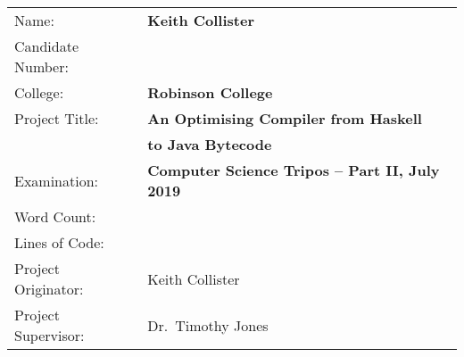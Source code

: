 \documentclass[dissertation.tex]{subfiles}
\begin{document}
{\large
\begin{tabular}{ll}
Name:               & \textbf{Keith Collister} \\
Candidate Number:   & \textbf{} \\
College:            & \textbf{Robinson College} \\
Project Title:      & \textbf{An Optimising Compiler from Haskell} \\
                    & \textbf{to Java Bytecode} \\
Examination:        & \textbf{Computer Science Tripos -- Part II, July 2019} \\
Word Count:         & \textbf{} \\
Lines of Code:      & \textbf{} \\
Project Originator: & Keith Collister \\
Project Supervisor: & Dr.\ Timothy Jones \\ 
\end{tabular}
}
\end{document}
